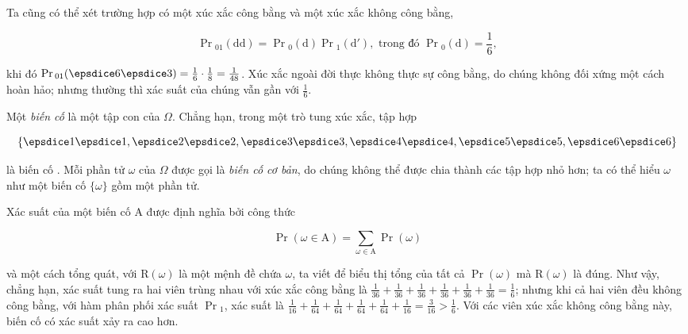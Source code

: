 Ta cũng có thể xét trường hợp có một xúc xắc công bằng và một xúc xắc không công bằng,

\begin{equation}\label{eq:8.3}
    \Pr\mathrm{}_{01}( \mathrm{d} \mathrm{d} ) = \Pr\mathrm{}_0( \mathrm{d} ) \Pr\mathrm{}_1( \mathrm{d'} ), \text{ trong đó } \Pr\mathrm{}_0( \mathrm{d} ) = \frac{1}{6},
\end{equation}

khi đó $\Pr\mathrm{}_{01}( \vcdice{6} \vcdice{3} ) = \frac{1}{6} \cdot \frac{1}{8} = \frac{1}{48}$.
Xúc xắc ngoài đời thực không thực sự công bằng, do chúng không đối xứng một cách hoàn hảo; nhưng thường thì xác suất của chúng vẫn gần với $\frac{1}{6}$.

Một \textit{biến cố} là một tập con của $\Omega$.
Chẳng hạn, trong một trò tung xúc xắc, tập hợp

\begin{equation*}
    \{ \vcdice{1} \vcdice{1}, \vcdice{2} \vcdice{2}, \vcdice{3} \vcdice{3}, \vcdice{4} \vcdice{4}, \vcdice{5} \vcdice{5}, \vcdice{6} \vcdice{6} \}
\end{equation*}

là biến cố .
Mỗi phần tử $\omega$ của $\Omega$ được gọi là \textit{biến cố cơ bản}, do chúng không thể được chia thành các tập hợp nhỏ hơn; ta có thể hiểu $\omega$ như một biến cố $\{ \omega \}$ gồm một phần tử.

\textsl{}Xác suất của một biến cố $\mathrm{A}$ được định nghĩa bởi công thức

\begin{equation}\label{eq:8.4}
    \Pr( \omega \in \mathrm{A} ) = \sum_{\omega \in \mathrm{A}} \Pr( \omega )
\end{equation}

và một cách tổng quát, với $\mathrm{R}( \omega )$ là một mệnh đề chứa $\omega$, ta viết  để biểu thị tổng của tất cả $\Pr( \omega )$ mà $\mathrm{R}( \omega )$ là đúng.
Như vậy, chẳng hạn, xác suất tung ra hai viên trùng nhau với xúc xắc công bằng là $\frac{1}{36} + \frac{1}{36} + \frac{1}{36} + \frac{1}{36} + \frac{1}{36} + \frac{1}{36} = \frac{1}{6}$; nhưng khi cả hai viên đều không công bằng, với hàm phân phối xác suất $\Pr\mathrm{}_1$, xác suất là $\frac{1}{16} + \frac{1}{64} + \frac{1}{64} + \frac{1}{64} + \frac{1}{64} + \frac{1}{16} = \frac{3}{16} > \frac{1}{6}$.
Với các viên xúc xắc không công bằng này, biến cố  có xác suất xảy ra cao hơn.